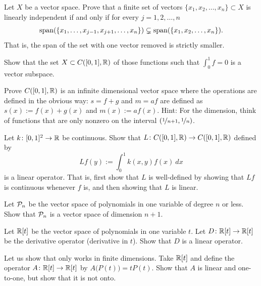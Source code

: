 \begin{exercise}
Let $X$ be a vector space.
Prove that a finite set of vectors $\{ x_1,x_2,\ldots,x_n \} \subset X$ 
is linearly independent if and only if for every $j=1,2,\ldots,n$
\begin{equation*}
\operatorname{span}( \{ x_1,\ldots,x_{j-1},x_{j+1},\ldots,x_n \}) \subsetneq
\operatorname{span}( \{ x_1,x_2,\ldots,x_n \}) .
\end{equation*}
That is, the span of the set with one vector removed is strictly smaller.
\end{exercise}

\begin{exercise}
Show that the set $X \subset C([0,1],{\mathbb{R}})$ of those functions such 
that $\int_0^1 f = 0$ is a vector subspace.
\end{exercise}

\begin{exercise}[Challenging]
Prove $C([0,1],{\mathbb{R}})$ is an infinite dimensional vector space
where the operations are defined in the obvious way:
$s=f+g$ and $m=af$ are defined as
$s(x) := f(x)+g(x)$ and
$m(x) := a f(x)$.
Hint: For the dimension, think of functions that are only nonzero
on the interval $(\nicefrac{1}{n+1},\nicefrac{1}{n})$.
\end{exercise}

\begin{exercise}[Challenging]
Let $k \colon [0,1]^2 \to {\mathbb{R}}$ be continuous.  Show that
$L \colon C([0,1],{\mathbb{R}}) \to C([0,1],{\mathbb{R}})$ defined by
\begin{equation*}
Lf(y) := \int_0^1 k(x,y)f(x)~dx
\end{equation*}
is a linear operator.  That is, first show that $L$ is well-defined by
showing that $Lf$ is continuous whenever $f$ is, and
then showing that $L$ is linear.
\end{exercise}

\begin{exercise}
Let ${\mathcal{P}}_n$ be the vector space of polynomials in one variable of degree $n$
or less.  Show that ${\mathcal{P}}_n$ is a vector space of dimension $n+1$.
\end{exercise}

\begin{exercise}
Let ${\mathbb{R}}[t]$ be the vector space of polynomials in one variable $t$.  Let
$D \colon {\mathbb{R}}[t] \to {\mathbb{R}}[t]$ be the derivative operator (derivative in $t$).
Show that $D$ is a linear operator.
\end{exercise}

\begin{exercise}
Let us show that  only works in finite
dimensions.  Take ${\mathbb{R}}[t]$ and define the operator $A \colon {\mathbb{R}}[t] \to {\mathbb{R}}[t]$
by $A\bigl(P(t)\bigr) = tP(t)$.  Show that $A$ is linear and one-to-one, but
show that it is not onto.
\end{exercise}


